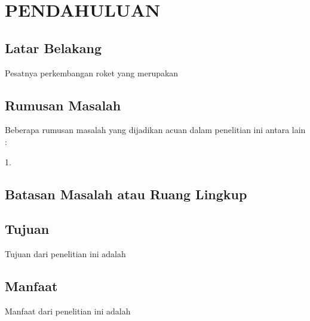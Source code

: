 \chapter{PENDAHULUAN}

\section{Latar Belakang}

Pesatnya perkembangan roket yang merupakan \lipsum[2]

\lipsum[3]

\section{Rumusan Masalah}

Beberapa rumusan masalah yang dijadikan acuan dalam penelitian ini antara lain : \parencite{Newton1687}

1. 

\section{Batasan Masalah atau Ruang Lingkup}

\lipsum[6]

\section{Tujuan}

Tujuan dari penelitian ini adalah \lipsum[7][1-14]

\section{Manfaat}

Manfaat dari penelitian ini adalah \lipsum[8][1-14]
